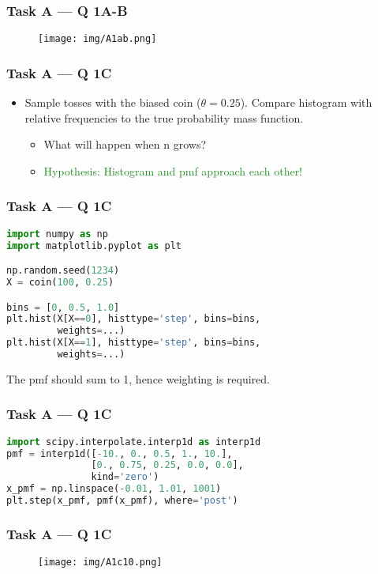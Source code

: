 \documentclass[usenames,dvipsnames]{beamer}
\begin{document}
\begin{frame}[fragile]
\frametitle{Task A --- Q 1A-B}
\begin{figure}
\centering
\texttt{[image: img/A1ab.png]}
\end{figure}
\end{frame}







\begin{frame}
\frametitle{Task A --- Q 1C}
\begin{itemize}
\item Sample tosses with the biased coin ($\theta=0.25$). Compare histogram with relative frequencies to the true probability mass function.
	\begin{itemize}
	\item What will happen when n grows?
	\item \textcolor{ForestGreen}{Hypothesis: Histogram and pmf approach each other!}
	\end{itemize}
\end{itemize}
\end{frame}

\begin{frame}[fragile]
\frametitle{Task A --- Q 1C}
\begin{lstlisting}[language=Python]
import numpy as np
import matplotlib.pyplot as plt

np.random.seed(1234)
X = coin(100, 0.25)

bins = [0, 0.5, 1.0]
plt.hist(X[X==0], histtype='step', bins=bins,
         weights=...)
plt.hist(X[X==1], histtype='step', bins=bins,
         weights=...)
\end{lstlisting}
\vspace{2em}
The pmf should sum to 1, hence weighting is required.
\end{frame}

\begin{frame}[fragile]
\frametitle{Task A --- Q 1C}
\begin{lstlisting}[language=Python]
import scipy.interpolate.interp1d as interp1d
pmf = interp1d([-10., 0., 0.5, 1., 10.],
               [0., 0.75, 0.25, 0.0, 0.0],
               kind='zero')
x_pmf = np.linspace(-0.01, 1.01, 1001)
plt.step(x_pmf, pmf(x_pmf), where='post')
\end{lstlisting}
\end{frame}

\begin{frame}
\frametitle{Task A --- Q 1C}
\begin{figure}
\centering
\texttt{[image: img/A1c10.png]}
\end{figure}
\end{frame}
\end{document}
